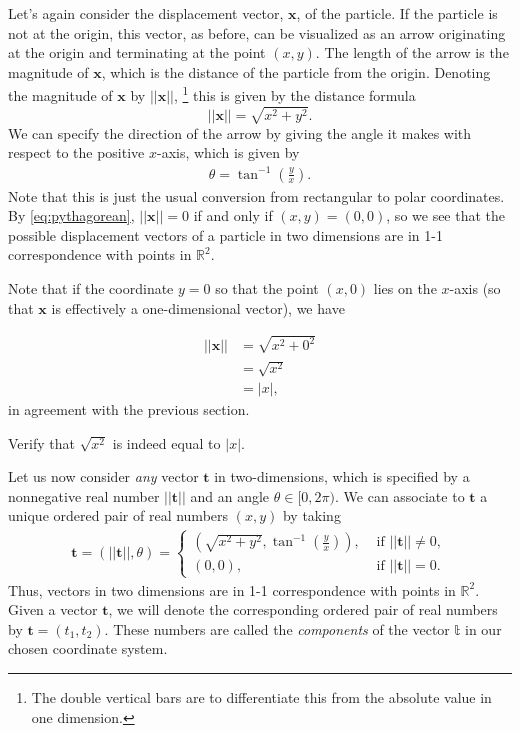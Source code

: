 \documentclass[12pt,letterpaper,reqno]{article}
\numberwithin{equation}{section}
\begin{document}
Let's again consider the displacement vector, $\mathbf{x}$, of the particle. If the particle is not at the origin, this vector, as before, can be visualized as an arrow originating at the origin and terminating at the point $(x,y)$. The length of the arrow is the magnitude of $\mathbf{x}$, which is the distance of the particle from the origin. Denoting the magnitude of $\mathbf{x}$ by $||\mathbf{x}||$, \footnote{The double vertical bars are to differentiate this from the absolute value in one dimension.}
this is given by the distance formula
\begin{equation}\label{eq:pythagorean}
	||\mathbf{x}||=\sqrt{x^2+y^2}.
\end{equation}
We can specify the direction of the arrow by giving the angle it makes with respect to the positive $x$-axis, which is given by
\begin{align*}
	\theta=\tan^{-1}\left(\frac{y}{x}\right).
\end{align*}
Note that this is just the usual conversion from rectangular to polar coordinates. By \eqref{eq:pythagorean}, $||\mathbf{x}||=0$ if and only if $(x,y)=(0,0)$, so we see that the possible displacement vectors of a particle in two dimensions are in 1-1 correspondence with points in $\mathbb{R}^2$.

Note that if the coordinate $y=0$ so that the point $(x,0)$ lies on the $x$-axis (so that $\mathbf{x}$ is effectively a one-dimensional vector), we have

\begin{align*}
	||\mathbf{x}||&=\sqrt{x^2+0^2} \\
	&=\sqrt{x^2} \\
	&=|x|,
\end{align*}
in agreement with the previous section.

\begin{exercise}
Verify that $\sqrt{x^2}$ is indeed equal to $|x|$.	
\end{exercise}

Let us now consider \emph{any} vector $\mathbf{t}$ in two-dimensions, which is specified by a nonnegative real number $||\mathbf{t}||$ and an angle $\theta \in [0,2\pi)$. We can associate to $\mathbf{t}$ a unique ordered pair of real numbers $(x,y)$ by taking
\begin{align*}
	\mathbf{t}=(||\mathbf{t}||,\theta)=\begin{cases}
		(\sqrt{x^2+y^2}, \tan^{-1}\left(\frac{y}{x}\right)), &\text{ if } ||\mathbf{t}|| \neq 0, \\
		(0,0), &\text{ if } ||\mathbf{t}||=0.
	\end{cases}
\end{align*}
Thus, vectors in two dimensions are in 1-1 correspondence with points in $\mathbb{R}^2$. Given a vector $\mathbf{t}$, we will denote the corresponding ordered pair of real numbers by $\mathbf{t}=(t_1,t_2)$. These numbers are called the \emph{components} of the vector $\mathbb{t}$ in our chosen coordinate system.
\end{document}
